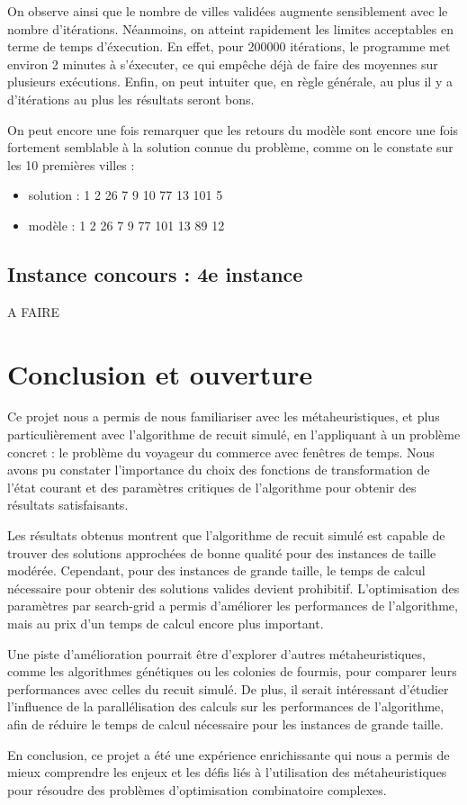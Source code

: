 \documentclass[a4paper, 12pt]{article}
\begin{document}
On observe ainsi que le nombre de villes validées augmente sensiblement avec le nombre d'itérations.
Néanmoins, on atteint rapidement les limites acceptables en terme de temps d'éxecution. En effet, pour 200000 itérations, le programme met environ 2 minutes à s'éxecuter, ce qui empêche déjà de faire des moyennes sur plusieurs exécutions.
Enfin, on peut intuiter que, en règle générale, au plus il y a d'itérations au plus les résultats seront bons.


On peut encore une fois remarquer que les retours du modèle sont encore une fois fortement semblable à la solution connue du problème, comme on le constate sur les 10 premières villes :
\begin{itemize}
    \item solution : 1 2 26 7 9 10 77  13 101 5
    \item modèle   : 1 2 26 7 9 77 101 13 89  12
\end{itemize}

\subsection{Instance concours : 4e instance}
A FAIRE


\section{Conclusion et ouverture}
Ce projet nous a permis de nous familiariser avec les métaheuristiques, et plus particulièrement avec l'algorithme de recuit simulé, en l'appliquant à un problème concret : le problème du voyageur du commerce avec fenêtres de temps. Nous avons pu constater l'importance du choix des fonctions de transformation de l'état courant et des paramètres critiques de l'algorithme pour obtenir des résultats satisfaisants.

Les résultats obtenus montrent que l'algorithme de recuit simulé est capable de trouver des solutions approchées de bonne qualité pour des instances de taille modérée. Cependant, pour des instances de grande taille, le temps de calcul nécessaire pour obtenir des solutions valides devient prohibitif. L'optimisation des paramètres par search-grid a permis d'améliorer les performances de l'algorithme, mais au prix d'un temps de calcul encore plus important.

Une piste d'amélioration pourrait être d'explorer d'autres métaheuristiques, comme les algorithmes génétiques ou les colonies de fourmis, pour comparer leurs performances avec celles du recuit simulé. De plus, il serait intéressant d'étudier l'influence de la parallélisation des calculs sur les performances de l'algorithme, afin de réduire le temps de calcul nécessaire pour les instances de grande taille.

En conclusion, ce projet a été une expérience enrichissante qui nous a permis de mieux comprendre les enjeux et les défis liés à l'utilisation des métaheuristiques pour résoudre des problèmes d'optimisation combinatoire complexes.
\end{document}
